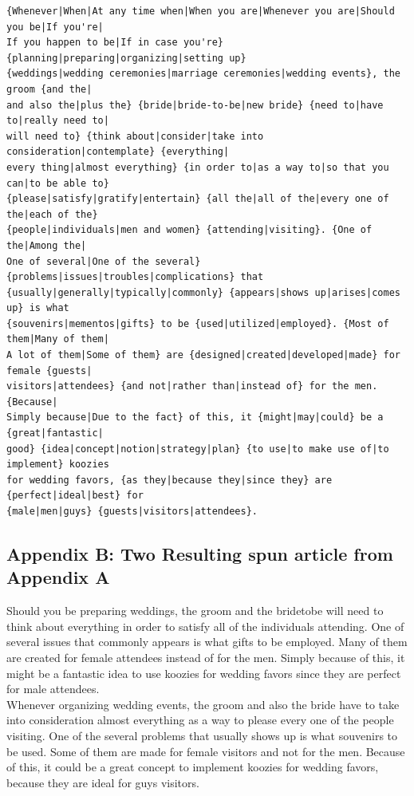 \documentclass[11pt,letterpaper,oneside, titlepage]{scrartcl}
\begin{document}
\begin{verbatim}{Whenever|When|At any time when|When you are|Whenever you are|Should you be|If you're|
If you happen to be|If in case you're} {planning|preparing|organizing|setting up} 
{weddings|wedding ceremonies|marriage ceremonies|wedding events}, the groom {and the|
and also the|plus the} {bride|bride-to-be|new bride} {need to|have to|really need to|
will need to} {think about|consider|take into consideration|contemplate} {everything|
every thing|almost everything} {in order to|as a way to|so that you can|to be able to}
{please|satisfy|gratify|entertain} {all the|all of the|every one of the|each of the}
{people|individuals|men and women} {attending|visiting}. {One of the|Among the|
One of several|One of the several} {problems|issues|troubles|complications} that 
{usually|generally|typically|commonly} {appears|shows up|arises|comes up} is what 
{souvenirs|mementos|gifts} to be {used|utilized|employed}. {Most of them|Many of them|
A lot of them|Some of them} are {designed|created|developed|made} for female {guests|
visitors|attendees} {and not|rather than|instead of} for the men. {Because|
Simply because|Due to the fact} of this, it {might|may|could} be a {great|fantastic|
good} {idea|concept|notion|strategy|plan} {to use|to make use of|to implement} koozies
for wedding favors, {as they|because they|since they} are {perfect|ideal|best} for 
{male|men|guys} {guests|visitors|attendees}.
\end{verbatim}
 
\subsection{Appendix B: Two Resulting spun article from Appendix A}


Should you be preparing weddings, the groom and the bridetobe will need to think about everything in order to satisfy all of the individuals attending. One of several issues that commonly appears is what gifts to be employed. Many of them are created for female attendees instead of for the men. Simply because of this, it might be a fantastic idea to use koozies for wedding favors since they are perfect for male attendees.
\\

Whenever organizing wedding events, the groom and also the bride have to take into consideration almost everything as a way to please every one of the people visiting. One of the several problems that usually shows up is what souvenirs to be used. Some of them are made for female visitors and not for the men. Because of this, it could be a great concept to implement koozies for wedding favors, because they are ideal for guys visitors.
\end{document}
